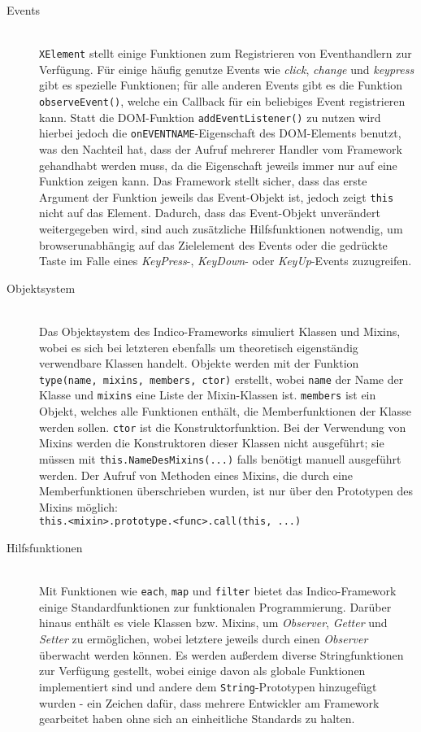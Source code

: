 \begin{description}
\item[Events] \hfill \\
\lstinline{XElement} stellt einige Funktionen zum Registrieren von Eventhandlern zur Verfügung. Für
einige häufig genutze Events wie \emph{click}, \emph{change} und \emph{keypress} gibt es spezielle
Funktionen; für alle anderen Events gibt es die Funktion \lstinline{observeEvent()}, welche ein
Callback für ein beliebiges Event registrieren kann. Statt die DOM-Funktion
\lstinline{addEventListener()} zu nutzen wird hierbei jedoch die \lstinline{onEVENTNAME}-Eigenschaft
des DOM-Elements benutzt, was den Nachteil hat, dass der Aufruf mehrerer Handler vom Framework
gehandhabt werden muss, da die Eigenschaft jeweils immer nur auf eine Funktion zeigen kann. Das
Framework stellt sicher, dass das erste Argument der Funktion jeweils das Event-Objekt ist, jedoch
zeigt \lstinline{this} nicht auf das Element. Dadurch, dass das Event-Objekt unverändert
weitergegeben wird, sind auch zusätzliche Hilfsfunktionen notwendig, um browserunabhängig auf das
Zielelement des Events oder die gedrückte Taste im Falle eines \emph{KeyPress}-, \emph{KeyDown}-
oder \emph{KeyUp}-Events zuzugreifen.

\item[Objektsystem] \hfill \\
Das Objektsystem des Indico-Frameworks simuliert Klassen und Mixins, wobei es sich bei letzteren
ebenfalls um theoretisch eigenständig verwendbare Klassen handelt. Objekte werden mit der Funktion
\lstinline{type(name, mixins, members, ctor)} erstellt, wobei \lstinline{name} der Name der Klasse
und \lstinline{mixins} eine Liste der Mixin-Klassen ist. \lstinline{members} ist ein Objekt, welches
alle Funktionen enthält, die Memberfunktionen der Klasse werden sollen. \lstinline{ctor} ist die
Konstruktorfunktion. Bei der Verwendung von Mixins werden die Konstruktoren dieser Klassen nicht
ausgeführt; sie müssen mit \lstinline{this.NameDesMixins(...)} falls benötigt manuell ausgeführt
werden. Der Aufruf von Methoden eines Mixins, die durch eine Memberfunktionen überschrieben wurden,
ist nur über den Prototypen des Mixins möglich: \\
\lstinline{this.<mixin>.prototype.<func>.call(this, ...)}

\item[Hilfsfunktionen] \hfill \\
Mit Funktionen wie \lstinline{each}, \lstinline{map} und \lstinline{filter} bietet das
Indico-Framework einige Standardfunktionen zur funktionalen Programmierung. Darüber hinaus enthält es
viele Klassen bzw. Mixins, um \emph{Observer}, \emph{Getter} und \emph{Setter} zu ermöglichen, wobei
letztere jeweils durch einen \emph{Observer} überwacht werden können. Es werden außerdem diverse
Stringfunktionen zur Verfügung gestellt, wobei einige davon als globale Funktionen implementiert
sind und andere dem \lstinline{String}-Prototypen hinzugefügt wurden - ein Zeichen dafür, dass
mehrere Entwickler am Framework gearbeitet haben ohne sich an einheitliche Standards zu halten.


\end{description}
